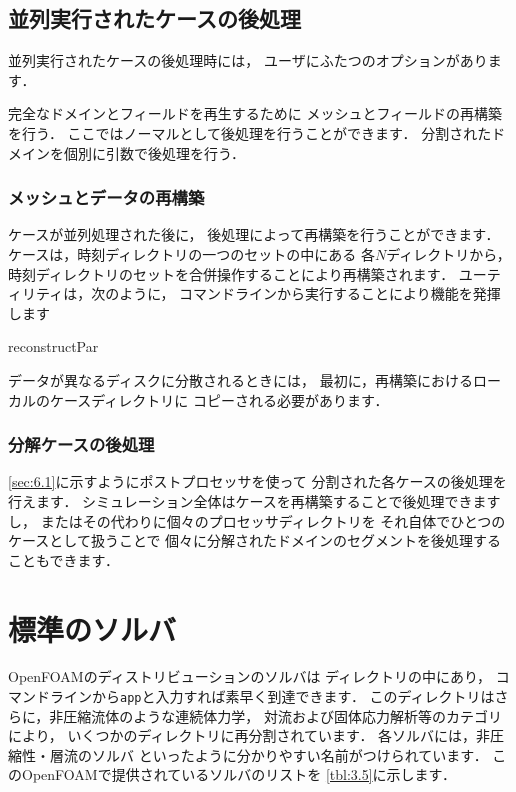\subsection{並列実行されたケースの後処理}
\label{ssec:3.4.4}
並列実行されたケースの後処理時には，
ユーザにふたつのオプションがあります．

完全なドメインとフィールドを再生するために
メッシュとフィールドの再構築を行う．
ここではノーマルとして後処理を行うことができます．
分割されたドメインを個別に引数で後処理を行う．

\subsubsection{メッシュとデータの再構築}
\label{sssec:3.4.4.1}
ケースが並列処理された後に，
後処理によって再構築を行うことができます．
ケースは，時刻ディレクトリの一つのセットの中にある
各$N$ディレクトリから，
時刻ディレクトリのセットを合併操作することにより再構築されます．
%
%
ユーティリティは，次のように，
コマンドラインから実行することにより機能を発揮します
\begin{OFverbatim}[terminal]
reconstructPar
\end{OFverbatim}
データが異なるディスクに分散されるときには，
最初に，再構築におけるローカルのケースディレクトリに
コピーされる必要があります．

\subsubsection{分解ケースの後処理}
\label{sssec:3.4.4.2}
\autoref{sec:6.1}に示すようにポストプロセッサを使って
分割された各ケースの後処理を行えます．
シミュレーション全体はケースを再構築することで後処理できますし，
またはその代わりに個々のプロセッサディレクトリを
それ自体でひとつのケースとして扱うことで
個々に分解されたドメインのセグメントを後処理することもできます．



\section{標準のソルバ}
\label{sec:3.5}
OpenFOAMのディストリビューションのソルバは
ディレクトリの中にあり，
コマンドラインから\texttt{app}と入力すれば素早く到達できます．
このディレクトリはさらに，非圧縮流体のような連続体力学，
対流および固体応力解析等のカテゴリにより，
いくつかのディレクトリに再分割されています．
各ソルバには，非圧縮性・層流のソルバ
といったように分かりやすい名前がつけられています．
このOpenFOAMで提供されているソルバのリストを
\autoref{tbl:3.5}に示します．


